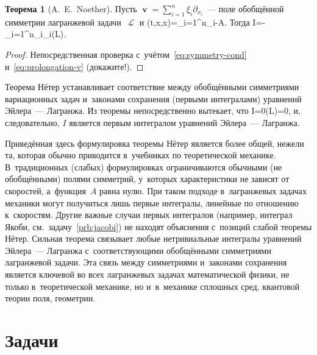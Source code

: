 \documentclass[a4paper,11pt]{article}
\def\[#1\]{\begin{align*}#1\end{align*}}
\newcommand\eqtag[1]{\refstepcounter{equation}\tag{\theequation}\label{#1}}
\theoremstyle{definition}
\newtheorem*{theorem*}{Теорема}
\begin{document}
\begin{theorem*}[A.~E.~Noether]
Пусть $\mbfv=\sum_{i=1}^n\xi_i\partial_{x_i}$~— поле обобщённой симметрии
лагранжевой задачи~$\mscrL$ и
	\[
	I(t,x,\dot x)=\sum_{i=1}^n\xi_i-A.
	\]
Тогда
	\[
	\dot I=-\sum_{i=1}^n\xi_i\mbfsansE_i(L).
	\eqtag{eq:dotI}
	\]
\end{theorem*}

\begin{proof}
Непосредственная проверка с~учётом~\eqref{eq:symmetry-cond}
и~\eqref{eq:prolongation-v} (докажите!).
\end{proof}

Теорема Нётер устанавливает соответствие между обобщёнными симметриями
вариационных задач и~законами сохранения (первыми интегралами) уравнений
Эйлера~— Лагранжа. Из теоремы непосредственно вытекает, что
	\[
	\dot I=0\bmod\mbfsansE(L)=0,
	\]
и, следовательно, $I$ является первым интегралом уравнений Эйлера~— Лагранжа.

Приведённая здесь формулировка теоремы Нётер является более общей, нежели та,
которая обычно приводится в~учебниках по теоретической механике. В~традиционных
(слабых) формулировках ограничиваются обычными (не обобщёнными) полями
симметрий, у~которых характеристики не зависят от скоростей, а~функция~$A$
равна нулю. При таком подходе в~лагранжевых задачах механики могут получиться
лишь первые интегралы, линейные по отношению к~скоростям. Другие важные случаи
первых интегралов (например, интеграл Якоби, см.~задачу~\ref{prb:jacobi}) не
находят объяснения с~позиций слабой теоремы Нётер. Сильная теорема связывает
любые нетривиальные интегралы уравнений Эйлера~— Лагранжа с~соответствующими
обобщёнными симметриями лагранжевой задачи. Эта связь между симметриями
и~законами сохранения является ключевой во всех лагранжевых задачах
математической физики, не только в~теоретической механике, но и~в~механике
сплошных сред, квантовой теории поля, геометрии.

\section{Задачи}
\end{document}
